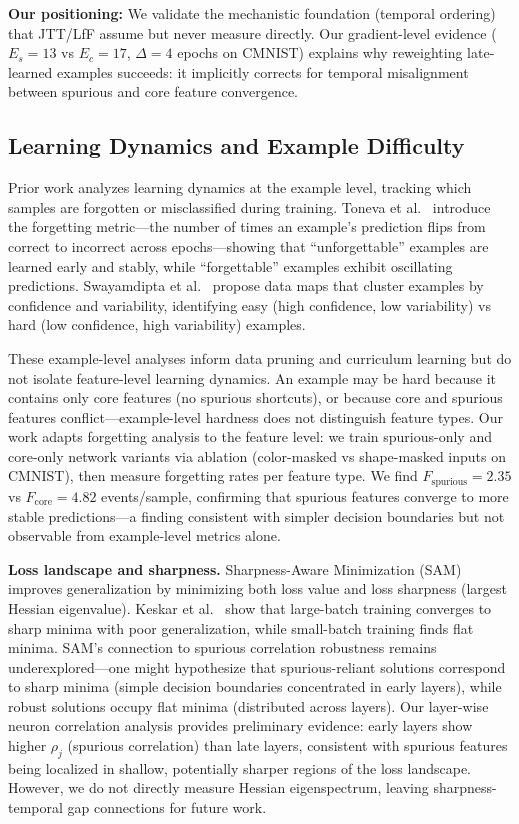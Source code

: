 \textbf{Our positioning:} We validate the mechanistic foundation (temporal ordering) that JTT/LfF assume but never measure directly. Our gradient-level evidence ($E_s=13$ vs $E_c=17$, $\Delta=4$ epochs on CMNIST) explains why reweighting late-learned examples succeeds: it implicitly corrects for temporal misalignment between spurious and core feature convergence.

\subsection{Learning Dynamics and Example Difficulty}

Prior work analyzes learning dynamics at the example level, tracking which samples are forgotten or misclassified during training. Toneva et al.~\cite{toneva2019empirical} introduce the forgetting metric---the number of times an example's prediction flips from correct to incorrect across epochs---showing that ``unforgettable'' examples are learned early and stably, while ``forgettable'' examples exhibit oscillating predictions. Swayamdipta et al.~\cite{swayamdipta2020dataset} propose data maps that cluster examples by confidence and variability, identifying easy (high confidence, low variability) vs hard (low confidence, high variability) examples.

These example-level analyses inform data pruning and curriculum learning but do not isolate feature-level learning dynamics. An example may be hard because it contains only core features (no spurious shortcuts), or because core and spurious features conflict---example-level hardness does not distinguish feature types. Our work adapts forgetting analysis to the feature level: we train spurious-only and core-only network variants via ablation (color-masked vs shape-masked inputs on CMNIST), then measure forgetting rates per feature type. We find $F_{\text{spurious}} = 2.35$ vs $F_{\text{core}} = 4.82$ events/sample, confirming that spurious features converge to more stable predictions---a finding consistent with simpler decision boundaries but not observable from example-level metrics alone.

\textbf{Loss landscape and sharpness.} Sharpness-Aware Minimization (SAM)~\cite{foret2021sharpness} improves generalization by minimizing both loss value and loss sharpness (largest Hessian eigenvalue). Keskar et al.~\cite{keskar2017large} show that large-batch training converges to sharp minima with poor generalization, while small-batch training finds flat minima. SAM's connection to spurious correlation robustness remains underexplored---one might hypothesize that spurious-reliant solutions correspond to sharp minima (simple decision boundaries concentrated in early layers), while robust solutions occupy flat minima (distributed across layers). Our layer-wise neuron correlation analysis provides preliminary evidence: early layers show higher $\rho_j$ (spurious correlation) than late layers, consistent with spurious features being localized in shallow, potentially sharper regions of the loss landscape. However, we do not directly measure Hessian eigenspectrum, leaving sharpness-temporal gap connections for future work.

